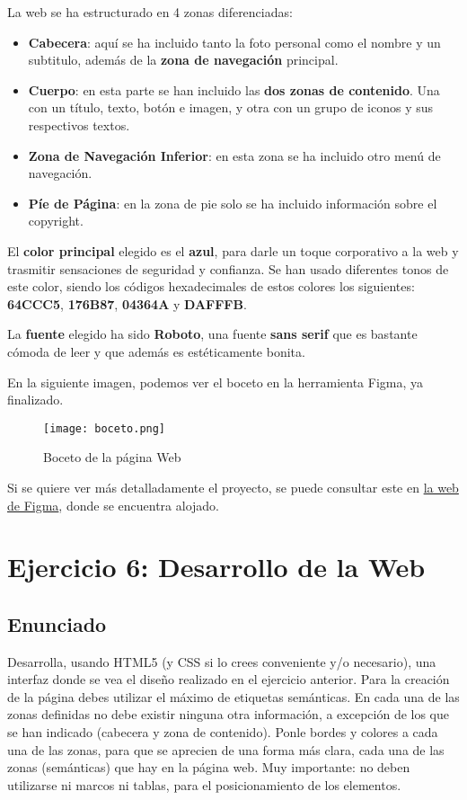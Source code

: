 La web se ha estructurado en 4 zonas diferenciadas:

\begin{itemize}
    \item \textbf{Cabecera}: aquí se ha incluido tanto la foto personal como el nombre y un subtitulo, además de la \textbf{zona de navegación} principal.
    \item \textbf{Cuerpo}: en esta parte se han incluido las \textbf{dos zonas de contenido}. Una con un título, texto, botón e imagen, y otra con un grupo de iconos y sus respectivos textos.
    \item \textbf{Zona de Navegación Inferior}: en esta zona se ha incluido otro menú de navegación.
    \item \textbf{Píe de Página}: en la zona de pie solo se ha incluido información sobre el copyright.
\end{itemize}

El \textbf{color principal} elegido es el \textbf{azul}, para darle un toque corporativo a la web y trasmitir sensaciones de seguridad y confianza. Se han usado diferentes tonos de este color, siendo los códigos hexadecimales de estos colores los siguientes: \textbf{64CCC5}, \textbf{176B87}, \textbf{04364A}  y \textbf{DAFFFB}.

La \textbf{fuente} elegido ha sido \textbf{Roboto}, una fuente \textbf{sans serif} que es bastante cómoda de leer y que además es estéticamente bonita.

En la siguiente imagen, podemos ver el boceto en la herramienta Figma, ya finalizado.

\begin{figure}[H]
    \centering
    \texttt{[image: boceto.png]}
    \caption{Boceto de la página Web}
\end{figure}

Si se quiere ver más detalladamente el proyecto, se puede consultar este en \href{https://www.figma.com/file/mUFhA9wFqySA6ou8wb1zEW/Desarrollo-Interfaces-Web?type=design&node-id=0%3A1&mode=design&t=Z6PpXOA2wEXOfK2i-1}{la web de Figma}, donde se encuentra alojado.

\section{Ejercicio 6: Desarrollo de la Web}
\subsection{Enunciado}
Desarrolla, usando HTML5 (y CSS si lo crees conveniente y/o necesario), una interfaz donde se vea el diseño realizado en el ejercicio anterior. Para la creación de la página debes utilizar el máximo de etiquetas semánticas. En cada una de las zonas definidas no debe existir ninguna otra información, a excepción de los que se han indicado (cabecera y zona de contenido). Ponle bordes y colores a cada una de las zonas, para que se aprecien de una forma más clara, cada una de las zonas (semánticas) que hay en la página web. Muy importante: no deben utilizarse ni marcos ni tablas, para el posicionamiento de los elementos.


